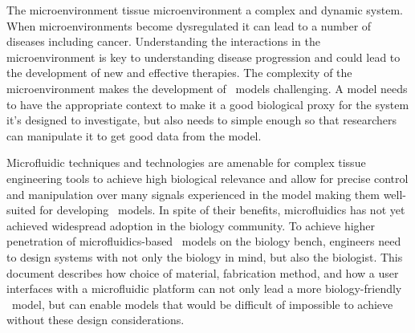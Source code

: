 The microenvironment tissue microenvironment a complex and dynamic system. When microenvironments become dysregulated it can lead to a number of diseases including cancer. Understanding the interactions in the microenvironment is key to understanding disease progression and could lead to the development of new and effective therapies. The complexity of the microenvironment makes the development of \invitro\ models challenging. A model needs to have the appropriate context to make it a good biological proxy for the system it's designed to investigate, but also needs to simple enough so that researchers can manipulate it to get good data from the model. 

Microfluidic techniques and technologies are amenable for complex tissue engineering tools to achieve high biological relevance and allow for precise control and manipulation over many signals experienced in the model making them well-suited for developing \invitro\ models. In spite of their benefits, microfluidics has not yet achieved widespread adoption in the biology community. To achieve higher penetration of microfluidics-based \invitro\ models on the biology bench, engineers need to design systems with not only the biology in mind, but also the biologist. This document describes how choice of material, fabrication method, and how a user interfaces with a microfluidic platform can not only lead a more biology-friendly \invitro\ model, but can enable models that would be difficult of impossible to achieve without these design considerations.